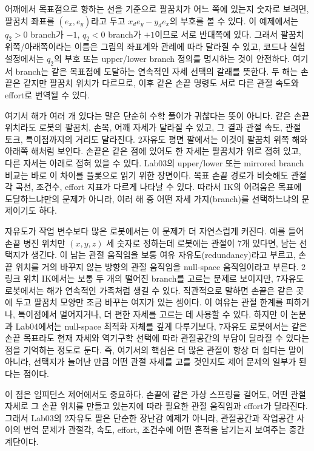 

어깨에서 목표점으로 향하는 선을 기준으로 팔꿈치가 어느 쪽에 있는지 숫자로 보려면, 팔꿈치 좌표를 \((e_x,e_y)\)라고 두고 \(x_d e_y-y_d e_x\)의 부호를 볼 수 있다.
이 예제에서는 \(q_2>0\) branch가 \(-1\), \(q_2<0\) branch가 \(+1\)이므로 서로 반대쪽에 있다.
그래서 팔꿈치 위쪽/아래쪽이라는 이름은 그림의 좌표계와 관례에 따라 달라질 수 있고, 코드나 실험 설정에서는 \(q_2\)의 부호 또는 upper/lower branch 정의를 명시하는 것이 안전하다.
여기서 branch는 같은 목표점에 도달하는 연속적인 자세 선택의 갈래를 뜻한다.
두 해는 손끝은 같지만 팔꿈치 위치가 다르므로, 이후 같은 손끝 명령도 서로 다른 관절 속도와 effort로 번역될 수 있다.

여기서 해가 여러 개 있다는 말은 단순히 수학 풀이가 귀찮다는 뜻이 아니다.
같은 손끝 위치라도 로봇의 팔꿈치, 손목, 어깨 자세가 달라질 수 있고, 그 결과 관절 속도, 관절 토크, 특이점까지의 거리도 달라진다.
2자유도 평면 팔에서는 이것이 팔꿈치 위쪽 해와 아래쪽 해처럼 보인다.
손끝은 같은 점에 있어도 한 자세는 팔꿈치가 위로 접혀 있고, 다른 자세는 아래로 접혀 있을 수 있다.
Lab03의 upper/lower 또는 mirrored branch 비교는 바로 이 차이를 플롯으로 읽기 위한 장면이다.
목표 손끝 경로가 비슷해도 관절각 곡선, 조건수, effort 지표가 다르게 나타날 수 있다.
따라서 IK의 어려움은 목표에 도달하느냐만의 문제가 아니라, 여러 해 중 어떤 자세 가지(branch)를 선택하느냐의 문제이기도 하다.

자유도가 작업 변수보다 많은 로봇에서는 이 문제가 더 자연스럽게 커진다.
예를 들어 손끝 병진 위치만 \((x,y,z)\) 세 숫자로 정하는데 로봇에는 관절이 7개 있다면, 남는 선택지가 생긴다.
이 남는 관절 움직임을 보통 여유 자유도(redundancy)라고 부르고, 손끝 위치를 거의 바꾸지 않는 방향의 관절 움직임을 null-space 움직임이라고 부른다.
2링크 위치 IK에서는 보통 두 개의 떨어진 branch를 고르는 문제로 보이지만, 7자유도 로봇에서는 해가 연속적인 가족처럼 생길 수 있다.
직관적으로 말하면 손끝은 같은 곳에 두고 팔꿈치 모양만 조금 바꾸는 여지가 있는 셈이다.
이 여유는 관절 한계를 피하거나, 특이점에서 멀어지거나, 더 편한 자세를 고르는 데 사용할 수 있다.
하지만 이 논문과 Lab04에서는 null-space 최적화 자체를 깊게 다루기보다, 7자유도 로봇에서는 같은 손끝 목표라도 현재 자세와 역기구학 선택에 따라 관절공간의 부담이 달라질 수 있다는 점을 기억하는 정도로 둔다.
즉, 여기서의 핵심은 더 많은 관절이 항상 더 쉽다는 말이 아니라, 선택지가 늘어난 만큼 어떤 관절 자세를 고를 것인지도 제어 문제의 일부가 된다는 점이다.

이 점은 임피던스 제어에서도 중요하다.
손끝에 같은 가상 스프링을 걸어도, 어떤 관절 자세로 그 손끝 위치를 만들고 있는지에 따라 필요한 관절 움직임과 effort가 달라진다.
그래서 Lab03의 2자유도 팔은 단순한 장난감 예제가 아니라, 관절공간과 작업공간 사이의 번역 문제가 관절각, 속도, effort, 조건수에 어떤 흔적을 남기는지 보여주는 중간 계단이다.

